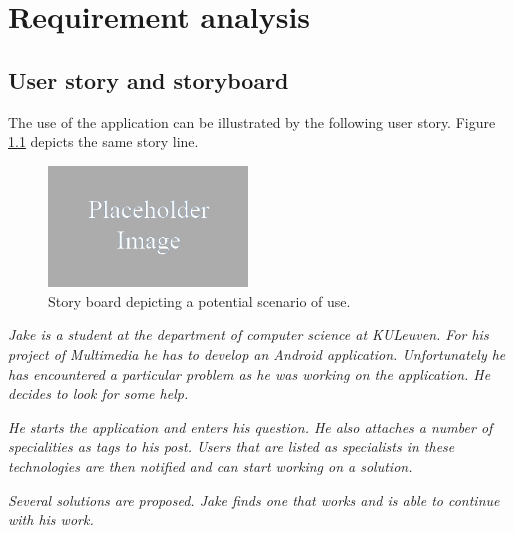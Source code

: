\chapter{Requirement analysis}\label{chapter:requirement_analysis}

\section{User story and storyboard}\label{section:story}

The use of the application can be illustrated by the following  user story. Figure \ref{figure:storyboard} depicts the same story line.

\begin{figure}
	\includegraphics[width=200px]{img/filename}
	\caption{Story board depicting a potential scenario of use.}
	\label{figure:storyboard}
\end{figure}


\textit{Jake is a student at the department of computer science at KULeuven. For his project of Multimedia he has to develop an Android application. Unfortunately he has encountered a particular problem as he was working on the application. He decides to look for some help.}

\textit{He starts the application and enters his question. He also attaches a number of specialities as tags to his post. Users that are listed as specialists in these technologies are then notified and can start working on a solution.}

\textit{Several solutions are proposed. Jake finds one that works and is able to continue with his work.}






